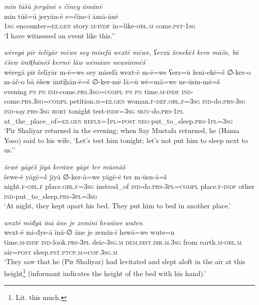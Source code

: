 \ea \label{ŽP.58}
\textit{min tūšū jeryānē e čīney āmānē} \\ 
\gll min tūš=ū jeryān-ē e=čīne-ī āmā-ānē \\ 
 \textsc{1sg} encounter\textsc{\textsc{=ez.gen}} story\textsc{.m}\textsc{-indf} in=like\textsc{-obl}\textsc{.m} come\textsc{.pst}\textsc{-\textsc{1sg}} \\ 
\glt `I have witnessed an event like this.’'
\z 
 
\ea \label{ŽP.62}
\textit{wēregā pīr šelīyār mēwe sey misefā wextē mēwe, ʕerzū ženekēš kero māčo, bā ēšew īmti̩hānēš kermē lāw wēmāwe newsinmēš} \\ 
\gll wēregā pīr šelīyār m-ē=we sey misefā wext-ē m-ē=we ʕerz=ū ženī-ekē=š ∅-ker-o m-āč-o bā ēšew īmti̩hān-ē=š ∅-ker-mē lā=ū wē=mā=we ne-ūsin-mē=š \\ 
 evening \textsc{pn} \textsc{pn} \textsc{ind-}come\textsc{.prs}\textsc{.3sg}\textsc{=compl} \textsc{pn} \textsc{pn} time\textsc{.m}\textsc{-indf} \textsc{ind-}come\textsc{.prs}\textsc{.3sg}\textsc{=compl} petition\textsc{.m}\textsc{\textsc{=ez.gen}} woman\textsc{.f}\textsc{-def}\textsc{.obl}\textsc{.f}\textsc{=3sg} \textsc{ind-}do\textsc{.prs}\textsc{-3sg} \textsc{ind-}say\textsc{.prs}\textsc{-3sg} \textsc{hort} tonight test\textsc{-indf}\textsc{=3sg} \textsc{sbjv-}do\textsc{.prs}\textsc{-1pl} at\_the\_place\_of\textsc{\textsc{=ez.gen}} \textsc{reflx}\textsc{=1pl}\textsc{=\textsc{post}} \textsc{neg-}put\_to\_sleep\textsc{.prs}\textsc{-1pl}\textsc{=3sg} \\ 
\glt `Pir Shaliyar returned in the evening; when Say Mustafa returned, he (Hama Yoso) said to his wife, ‘Let’s test him tonight; let’s not put him to sleep next to us.’'
\z 
 
\ea \label{ŽP.65}
\textit{šewē yāgēš jīyā kerāwe yāgē ter mūsnāš} \\ 
\gll šewe-ē yāgē=š jīyā ∅-ker-ā=we yāgē-ē ter m-ūsn-ā=š \\ 
 night\textsc{.f}\textsc{-obl}\textsc{.f} place\textsc{.obl}\textsc{.f}\textsc{=3sg} instead\_of \textsc{ind-}do\textsc{.prs}\textsc{-3pl}\textsc{=compl} place\textsc{.f}\textsc{-indf} other \textsc{ind-}put\_to\_sleep\textsc{.prs}\textsc{-3pl}\textsc{=3sg} \\ 
\glt `At night, they kept apart his bed. They put him to bed in another place.'
\z 
 
\ea \label{ŽP.68}
\textit{wextē miđyā īnā āne je zemīnī hewāwe wuten} \\ 
\gll wext-ē mi-đye-ā īnā-∅ āne je zemīn-ī hewā=we wute=n \\ 
 time\textsc{.m}\textsc{-indf} \textsc{ind-}look\textsc{.prs}\textsc{-3pl} deic\textsc{-3sg}\textsc{.m} \textsc{dem.dist}\textsc{.dir}\textsc{.m}\textsc{.3sg} from earth\textsc{.m}\textsc{-obl}\textsc{.m} air\textsc{=\textsc{post}} sleep\textsc{.pst}\textsc{.ptcp}\textsc{.m}\textsc{=cop}\textsc{.3sg}\textsc{.m} \\ 
\glt `They saw that he (Pir Shaliyar) had levitated and slept aloft in the air at this height\footnote{Lit. this much.} (informant indicates the height of the bed with his hand).'
\z 
 
